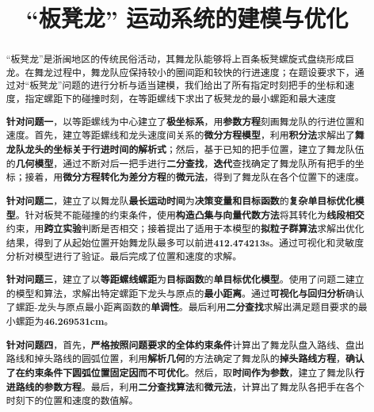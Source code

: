 \documentclass[a4paper]{article}
\title{“板凳龙” 运动系统的建模与优化}
\date{} %
\begin{document}
	\maketitle
	\vspace{-6em} %
	\begin{abstract}
		“板凳龙”是浙闽地区的传统民俗活动，其舞龙队能够将上百条板凳螺旋式盘绕形成巨龙。在舞龙过程中，舞龙队应保持较小的圈间距和较快的行进速度；在题设要求下，通过对“板凳龙”问题的进行分析与适当建模，我们给出了所有指定时刻把手的坐标和速度，指定螺距下的碰撞时刻，在等距螺线下求出了板凳龙的最小螺距和最大速度

		\hspace{0.2em}\textbf{针对问题一}，以等距螺线为中心建立了\textbf{极坐标系}，用\textbf{参数方程}刻画舞龙队的行进位置和速度。首先，建立等距螺线和龙头速度间关系的\textbf{微分方程模型}，利用\textbf{积分法}求解出了\textbf{舞龙队龙头的坐标关于行进时间的解析式}；然后，基于已知的把手位置，建立了舞龙队伍的\textbf{几何模型}，通过不断对后一把手进行\textbf{二分查找}，\textbf{迭代}查找确定了舞龙队所有把手的坐标；接着，用\textbf{微分方程转化为差分方程}的\textbf{微元法}，得到了舞龙队在各个位置下的速度。

		\textbf{针对问题二}，建立了以舞龙队\textbf{最长运动时间}为\textbf{决策变量和目标函数}的\textbf{复杂单目标优化模型}。针对板凳不能碰撞的约束条件，使用\textbf{构造凸集与向量代数方法}将其转化为\textbf{线段相交}约束，用\textbf{跨立实验}判断是否相交；接着提出了适用于本模型的\textbf{拟粒子群算法}求解出优化结果，得到了从起始位置开始舞龙队最多可以前进\textbf{412.474213s}。通过可视化和灵敏度分析对模型进行了验证。最后完成了位置和速度的求解。

		\textbf{针对问题三}，建立了以\textbf{等距螺线螺距}为\textbf{目标函数}的\textbf{单目标优化模型}。使用了问题二建立的模型和算法，求解出特定螺距下龙头与原点的\textbf{最小距离}。通过\textbf{可视化与回归分析}确认了螺距-龙头与原点最小距离函数的\textbf{单调性}。最后利用\textbf{二分查找}求解出满足题目要求的最小螺距为\textbf{46.269531cm}。

		\textbf{针对问题四}，首先，\textbf{严格按照问题要求的全体约束条件}计算出了舞龙队盘入路线、盘出路线和掉头路线的圆弧位置，利用\textbf{解析几何}的方法确定了舞龙队的\textbf{掉头路线方程}，\textbf{确认了在约束条件下圆弧位置固定因而不可优化}。然后，取\textbf{时间作为参数}，建立了舞龙队\textbf{行进路线的参数方程}。最后，利用\textbf{二分查找算法}和\textbf{微元法}，计算出了舞龙队各把手在各个时刻下的位置和速度的数值解。


\end{abstract}
\end{document}
